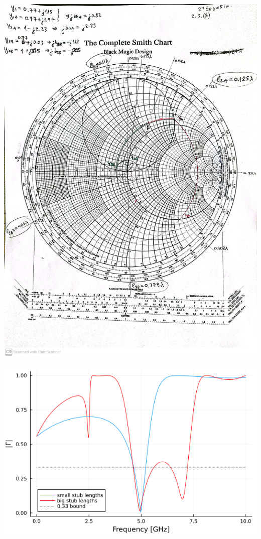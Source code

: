 \documentclass[12pt]{article}
\begin{document}
\begin{center}
    \includegraphics*[scale = 0.28]{smith_2_3b.jpg}
\end{center}
\begin{center}
    \includegraphics*[scale = 0.6]{reflection_2_3_b.png}
\end{center}
\end{document}
